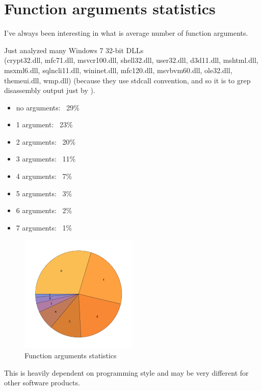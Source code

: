 \section{Function arguments statistics}
\label{args_stat}

I've always been interesting in what is average number of function arguments.

Just analyzed many Windows 7 32-bit DLLs \\
(crypt32.dll, mfc71.dll, msvcr100.dll, shell32.dll, 
user32.dll, d3d11.dll, mshtml.dll, msxml6.dll, sqlncli11.dll, wininet.dll, mfc120.dll, msvbvm60.dll, ole32.dll, themeui.dll, wmp.dll) 
(because they use stdcall convention, and so it is to grep disassembly output just by ).

\begin{itemize}
\item no arguments: ~29\%
\item 1 argument: ~23\%
\item 2 arguments: ~20\%
\item 3 arguments: ~11\%
\item 4 arguments: ~7\%
\item 5 arguments: ~3\%
\item 6 arguments: ~2\%
\item 7 arguments: ~1\%
\end{itemize}

\begin{figure}[H]
\centering
\includegraphics[width=0.5\textwidth]{other/args_stat.png}
\caption{Function arguments statistics}
\end{figure}

This is heavily dependent on programming style and may be very different for other software products.

